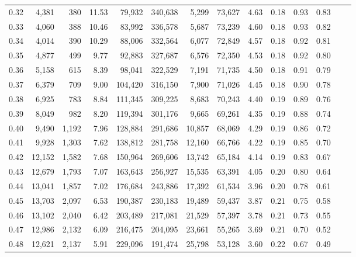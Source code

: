 \begin{tabular}{rrrrrrrrrrrrrr}
0.32 &   4,381 &    380 &   11.53 &   79,932 &  340,638 &   5,299 &  73,627 &  4.63 &  0.18 &  0.93 &      0.83 \\
0.33 &   4,060 &    388 &   10.46 &   83,992 &  336,578 &   5,687 &  73,239 &  4.60 &  0.18 &  0.93 &      0.82 \\
0.34 &   4,014 &    390 &   10.29 &   88,006 &  332,564 &   6,077 &  72,849 &  4.57 &  0.18 &  0.92 &      0.81 \\
0.35 &   4,877 &    499 &    9.77 &   92,883 &  327,687 &   6,576 &  72,350 &  4.53 &  0.18 &  0.92 &      0.80 \\
0.36 &   5,158 &    615 &    8.39 &   98,041 &  322,529 &   7,191 &  71,735 &  4.50 &  0.18 &  0.91 &      0.79 \\
0.37 &   6,379 &    709 &    9.00 &  104,420 &  316,150 &   7,900 &  71,026 &  4.45 &  0.18 &  0.90 &      0.78 \\
0.38 &   6,925 &    783 &    8.84 &  111,345 &  309,225 &   8,683 &  70,243 &  4.40 &  0.19 &  0.89 &      0.76 \\
0.39 &   8,049 &    982 &    8.20 &  119,394 &  301,176 &   9,665 &  69,261 &  4.35 &  0.19 &  0.88 &      0.74 \\
0.40 &   9,490 &  1,192 &    7.96 &  128,884 &  291,686 &  10,857 &  68,069 &  4.29 &  0.19 &  0.86 &      0.72 \\
0.41 &   9,928 &  1,303 &    7.62 &  138,812 &  281,758 &  12,160 &  66,766 &  4.22 &  0.19 &  0.85 &      0.70 \\
0.42 &  12,152 &  1,582 &    7.68 &  150,964 &  269,606 &  13,742 &  65,184 &  4.14 &  0.19 &  0.83 &      0.67 \\
0.43 &  12,679 &  1,793 &    7.07 &  163,643 &  256,927 &  15,535 &  63,391 &  4.05 &  0.20 &  0.80 &      0.64 \\
0.44 &  13,041 &  1,857 &    7.02 &  176,684 &  243,886 &  17,392 &  61,534 &  3.96 &  0.20 &  0.78 &      0.61 \\
0.45 &  13,703 &  2,097 &    6.53 &  190,387 &  230,183 &  19,489 &  59,437 &  3.87 &  0.21 &  0.75 &      0.58 \\
0.46 &  13,102 &  2,040 &    6.42 &  203,489 &  217,081 &  21,529 &  57,397 &  3.78 &  0.21 &  0.73 &      0.55 \\
0.47 &  12,986 &  2,132 &    6.09 &  216,475 &  204,095 &  23,661 &  55,265 &  3.69 &  0.21 &  0.70 &      0.52 \\
0.48 &  12,621 &  2,137 &    5.91 &  229,096 &  191,474 &  25,798 &  53,128 &  3.60 &  0.22 &  0.67 &      0.49 \\

\end{tabular}
